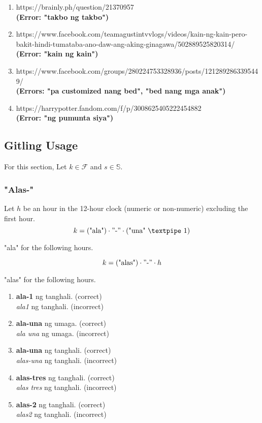 \begin{enumerate}
      \item https://brainly.ph/question/21370957 \\
      \textbf{(Error: "takbo ng takbo")}
      \item https://www.facebook.com/teamagustintvvlogs/videos/kain-ng-kain-pero-bakit-hindi-tumataba-ano-daw-ang-aking-ginagawa/502889525820314/ \\
      \textbf{(Error: "kain ng kain")}
      \item https://www.facebook.com/groups/280224753328936/posts/1212892863395449/ \\
      \textbf{(Errors: "pa customized nang bed", "bed nang mga anak")}
      \item https://harrypotter.fandom.com/f/p/3008625405222454882 \\
      \textbf{(Error: "ng pumunta siya")}
\end{enumerate}

\subsection{Gitling Usage}
For this section, Let \(k\in\mathcal{F}\) and \(s\in\mathbb{S}\).
\subsubsection{"Alas-"}
Let \(h\) be an hour in the 12-hour clock (numeric or non-numeric) excluding the first hour.
\[
      k = (\text{"ala"}) \cdot "\text{-}" \cdot (\text{"una"} \ {\textpipe} \ 1)
\]
\begin{center}
"ala" for the following hours.
\end{center}
\[
      k = (\text{"alas"}) \cdot "\text{-}" \cdot h
\]
\begin{center}
"alas" for the following hours.
\end{center}

\begin{example}
\end{example}
\begin{enumerate}
      \item \textbf{ala-1} ng tanghali. (correct) \\
            \textit{ala1} ng tanghali. (incorrect)
      \item \textbf{ala-una} ng umaga. (correct) \\
            \textit{ala una} ng umaga. (incorrect)
      \item \textbf{ala-una} ng tanghali. (correct) \\
            \textit{alas-una} ng tanghali. (incorrect)
      \item \textbf{alas-tres} ng tanghali. (correct) \\
            \textit{alas tres} ng tanghali. (incorrect)
      \item \textbf{alas-2} ng tanghali. (correct) \\
            \textit{alas2} ng tanghali. (incorrect)
\end{enumerate}

